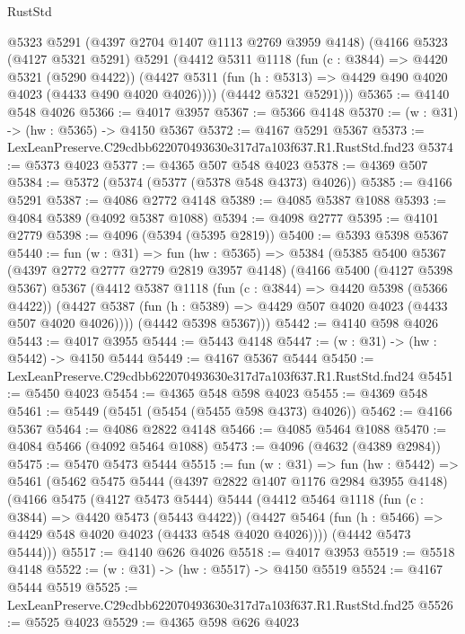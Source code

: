 \begin{lexlean}{RustStd}
\begin{coremodule}
      @5323
      @5291
      (@4397 @2704 @1407 @1113 @2769 @3959 @4148)
      (@4166
        @5323
        (@4127 @5321 @5291)
        @5291
        (@4412
          @5311
          @1118
          (fun (c : @3844) => @4420 @5321 (@5290 @4422))
          (@4427 @5311 (fun (h : @5313) => @4429 @490 @4020 @4023 (@4433 @490 @4020 @4026))))
        (@4442 @5321 @5291)))
@5365 := @4140 @548 @4026
@5366 := @4017 @3957
@5367 := @5366 @4148
@5370 := (w : @31) -> (hw : @5365) -> @4150 @5367
@5372 := @4167 @5291 @5367
@5373 := LexLeanPreserve.C29cdbb622070493630e317d7a103f637.R1.RustStd.fnd23
@5374 := @5373 @4023
@5377 := @4365 @507 @548 @4023
@5378 := @4369 @507
@5384 := @5372 (@5374 (@5377 (@5378 @548 @4373) @4026))
@5385 := @4166 @5291
@5387 := @4086 @2772 @4148
@5389 := @4085 @5387 @1088
@5393 := @4084 @5389 (@4092 @5387 @1088)
@5394 := @4098 @2777
@5395 := @4101 @2779
@5398 := @4096 (@5394 (@5395 @2819))
@5400 := @5393 @5398 @5367
@5440 := fun (w : @31) =>
  fun (hw : @5365) =>
  @5384
    (@5385
      @5400
      @5367
      (@4397 @2772 @2777 @2779 @2819 @3957 @4148)
      (@4166
        @5400
        (@4127 @5398 @5367)
        @5367
        (@4412
          @5387
          @1118
          (fun (c : @3844) => @4420 @5398 (@5366 @4422))
          (@4427 @5387 (fun (h : @5389) => @4429 @507 @4020 @4023 (@4433 @507 @4020 @4026))))
        (@4442 @5398 @5367)))
@5442 := @4140 @598 @4026
@5443 := @4017 @3955
@5444 := @5443 @4148
@5447 := (w : @31) -> (hw : @5442) -> @4150 @5444
@5449 := @4167 @5367 @5444
@5450 := LexLeanPreserve.C29cdbb622070493630e317d7a103f637.R1.RustStd.fnd24
@5451 := @5450 @4023
@5454 := @4365 @548 @598 @4023
@5455 := @4369 @548
@5461 := @5449 (@5451 (@5454 (@5455 @598 @4373) @4026))
@5462 := @4166 @5367
@5464 := @4086 @2822 @4148
@5466 := @4085 @5464 @1088
@5470 := @4084 @5466 (@4092 @5464 @1088)
@5473 := @4096 (@4632 (@4389 @2984))
@5475 := @5470 @5473 @5444
@5515 := fun (w : @31) =>
  fun (hw : @5442) =>
  @5461
    (@5462
      @5475
      @5444
      (@4397 @2822 @1407 @1176 @2984 @3955 @4148)
      (@4166
        @5475
        (@4127 @5473 @5444)
        @5444
        (@4412
          @5464
          @1118
          (fun (c : @3844) => @4420 @5473 (@5443 @4422))
          (@4427 @5464 (fun (h : @5466) => @4429 @548 @4020 @4023 (@4433 @548 @4020 @4026))))
        (@4442 @5473 @5444)))
@5517 := @4140 @626 @4026
@5518 := @4017 @3953
@5519 := @5518 @4148
@5522 := (w : @31) -> (hw : @5517) -> @4150 @5519
@5524 := @4167 @5444 @5519
@5525 := LexLeanPreserve.C29cdbb622070493630e317d7a103f637.R1.RustStd.fnd25
@5526 := @5525 @4023
@5529 := @4365 @598 @626 @4023

\end{coremodule}
\end{lexlean}
